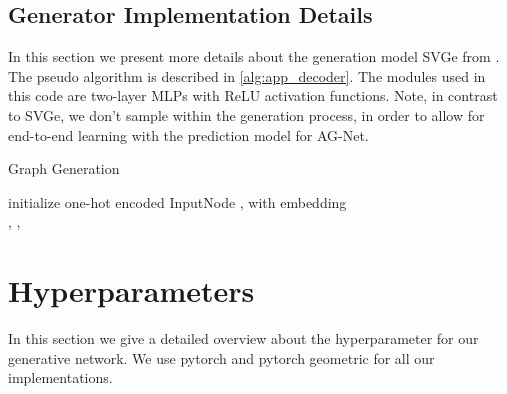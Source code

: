 \documentclass[runningheads]{llncs}
\begin{document}
\subsection{Generator Implementation Details}

In this section we present more details about the generation model SVGe from \cite{2021SVGe}.
The pseudo algorithm is described in \autoref{alg:app_decoder}. The modules  used in this code are two-layer MLPs with ReLU activation functions. Note, in contrast to SVGe, we don't sample within the generation process, in order to allow for end-to-end learning with the prediction model for AG-Net.
\begin{algorithm*}[t]
	\SetAlgoLined
	\caption{Graph Generation}\label{alg:app_decoder}
	\label{alg:decoder}
	\KwInput{}
	initialize one-hot encoded InputNode , with embedding  \\
	, ,
	 \\
	
\end{algorithm*}

\section{Hyperparameters}\label{sec:HP}
In this section we give a detailed overview about the hyperparameter for our generative network.
We use pytorch \cite{pytorch} and pytorch geometric \cite{PYG} for all our implementations. 
\end{document}

